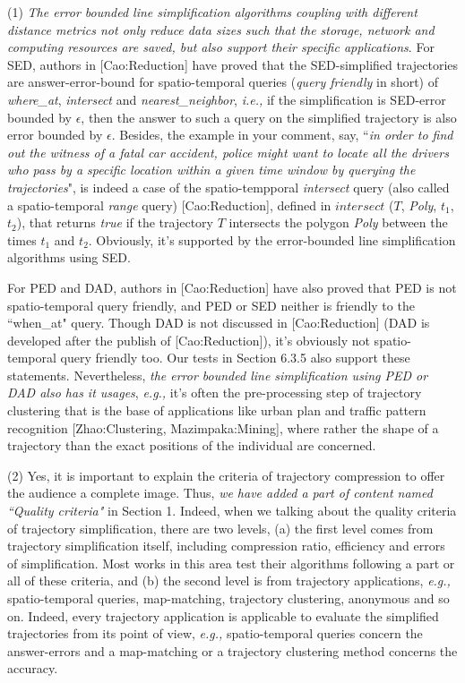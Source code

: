 \documentclass{letter}
\newcommand{\ie}{\emph{i.e.,}\xspace}
\newcommand{\eg}{\emph{e.g.,}\xspace}
\begin{document}
{(1) \emph{The error bounded line simplification algorithms coupling with different distance metrics not only reduce data sizes such that the storage, network and computing resources are saved, but also support their specific applications}. For SED, authors in [Cao:Reduction] have proved that the SED-simplified trajectories are answer-error-bound for spatio-temporal queries (\emph{query friendly} in short) of \emph{where\_at}, \emph{intersect} and \emph{nearest\_neighbor}, \ie if the simplification is SED-error bounded by $\epsilon$, then the answer to such a query on the simplified trajectory is also error bounded by $\epsilon$.
Besides, the example in your comment, say, ``\emph{in order to find out the witness of a fatal car accident, police might want to locate all the drivers who pass by a specific location within a given time window by querying the trajectories}", is indeed a case of the spatio-tempporal \emph{intersect} query (also called a spatio-temporal \emph{range} query) [Cao:Reduction], defined in $intersect$ ($T$, \emph{Poly}, $t_1$, $t_2$), that returns \emph{true} if the trajectory $T$ intersects the polygon \emph{Poly} between the times $t_1$ and $t_2$. Obviously, it's supported by the error-bounded line simplification algorithms using SED.

For PED and DAD, authors in [Cao:Reduction] have also proved that PED is not spatio-temporal query friendly, and PED or SED neither is friendly to the ``when\_at" query. Though DAD is not discussed in [Cao:Reduction] (DAD is developed after the publish of [Cao:Reduction]), it's obviously not spatio-temporal query friendly too. Our tests in Section 6.3.5 also support these statements. Nevertheless, \emph{the error bounded line simplification using PED or DAD also has it usages}, \eg it's often the pre-processing step of trajectory clustering that is the base of applications like urban plan and traffic pattern recognition [Zhao:Clustering, Mazimpaka:Mining], where rather the shape of a trajectory than the exact positions of the individual are concerned. 


(2) {Yes, it is important to explain the criteria of trajectory compression to offer the audience a complete image.} Thus, \emph{we have added a part of content named ``Quality criteria"} in Section 1. Indeed, when we talking about the quality criteria of trajectory simplification, there are two levels, 
(a) the first level comes from trajectory simplification itself, including compression ratio, efficiency and errors of simplification. Most works in this area test their algorithms following a part or all of these criteria, and 
(b) the second level is from trajectory applications, \eg spatio-temporal queries, map-matching, trajectory clustering, anonymous and so on. Indeed, every trajectory application is applicable to evaluate the simplified trajectories from its point of view, \eg spatio-temporal queries concern the answer-errors and a map-matching or a trajectory clustering method concerns the accuracy.

}
\end{document}
